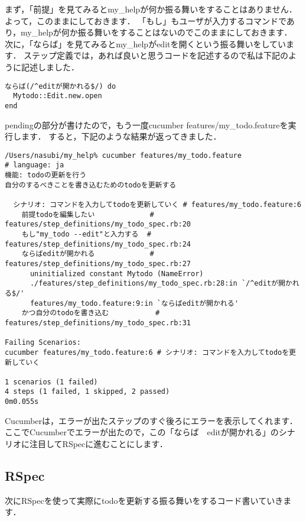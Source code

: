 まず，「前提」を見てみるとmy\_helpが何か振る舞いをすることはありません．
よって，このままにしておきます．
「もし」もユーザが入力するコマンドであり，my\_helpが何か振る舞いをすることはないのでこのままにしておきます．
次に，「ならば」を見てみるとmy\_helpがeditを開くという振る舞いをしています．
ステップ定義では，あれば良いと思うコードを記述するので私は下記のように記述しました．
\begin{lstlisting}[style=customCsh]
ならば(/^editが開かれる$/) do
  Mytodo::Edit.new.open
end
\end{lstlisting}
pendingの部分が書けたので，もう一度cucumber features/my\_todo.featureを実行します．
すると，下記のような結果が返ってきました．
\begin{lstlisting}[style=customCsh]
/Users/nasubi/my_help% cucumber features/my_todo.feature              
# language: ja
機能: todoの更新を行う
自分のするべきことを書き込むためのtodoを更新する

  シナリオ: コマンドを入力してtodoを更新していく # features/my_todo.feature:6
    前提todoを編集したい             # features/step_definitions/my_todo_spec.rb:20
    もし"my_todo --edit"と入力する  # features/step_definitions/my_todo_spec.rb:24
    ならばeditが開かれる             # features/step_definitions/my_todo_spec.rb:27
      uninitialized constant Mytodo (NameError)
      ./features/step_definitions/my_todo_spec.rb:28:in `/^editが開かれる$/'
      features/my_todo.feature:9:in `ならばeditが開かれる'
    かつ自分のtodoを書き込む           # features/step_definitions/my_todo_spec.rb:31

Failing Scenarios:
cucumber features/my_todo.feature:6 # シナリオ: コマンドを入力してtodoを更新していく

1 scenarios (1 failed)
4 steps (1 failed, 1 skipped, 2 passed)
0m0.055s

\end{lstlisting}
Cucumberは，エラーが出たステップのすぐ後ろにエラーを表示してくれます．
ここでCucumberでエラーが出たので，この「ならば　editが開かれる」のシナリオに注目してRSpecに進むことにします．

\subsection{RSpec}
次にRSpecを使って実際にtodoを更新する振る舞いをするコード書いていきます．

